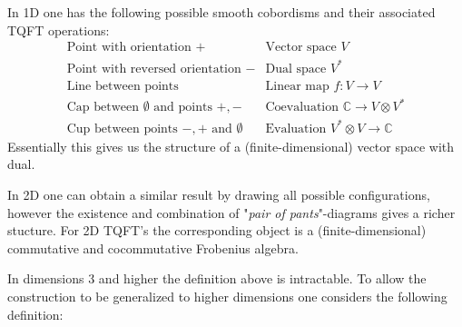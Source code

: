 	\begin{example}[1D]
		In 1D one has the following possible smooth cobordisms and their associated TQFT operations:
		\begin{equation*}
			\begin{array}{l|l}
				\text{Point with orientation } + & \text{Vector space } V\\
				\text{Point with reversed orientation } - & \text{Dual space } V^*\\
				\text{Line between points} & \text{Linear map } f:V\rightarrow V\\
				\text{Cap between $\emptyset$ and points } +, - & \text{Coevaluation } \mathbb{C}\rightarrow V\otimes V^*\\
				\text{Cup between points $-, +$ and }\emptyset & \text{Evaluation } V^*\otimes V\rightarrow\mathbb{C}
			\end{array}
		\end{equation*}
		Essentially this gives us the structure of a (finite-dimensional) vector space with dual.
	\end{example}
	
	\begin{example}[2D]
		In 2D one can obtain a similar result by drawing all possible configurations, however the existence and combination of "\textit{pair of pants}"-diagrams gives a richer stucture. For 2D TQFT's the corresponding object is a (finite-dimensional) commutative and cocommutative Frobenius algebra.
	\end{example}
	
	In dimensions 3 and higher the definition above is intractable. To allow the construction to be generalized to higher dimensions one considers the following definition:
